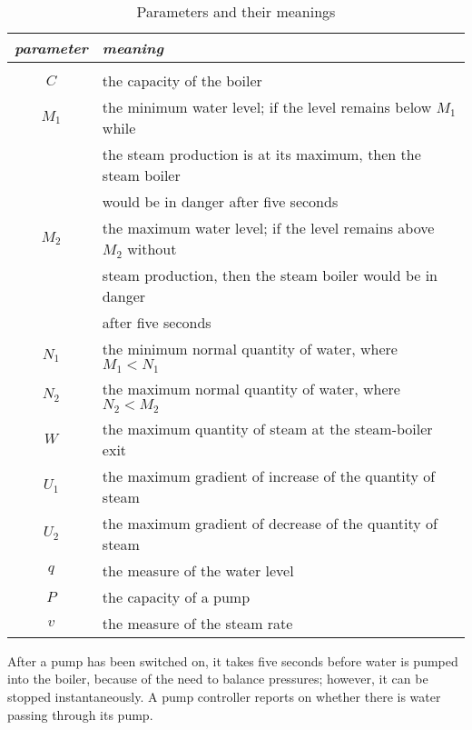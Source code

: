 \documentclass{report}
\begin{document}
\begin{table}[htbp]
  \bigskip %
  \begin{center}\slshape
    \begin{tabular}{c|l}
      \textbf{\slshape parameter} & \textbf{\slshape meaning}
      \\[1mm] %
      \hline %
      \\[-3mm] %
      \( C \) & the capacity of the boiler
      \\ %
      \( M_1 \) & the minimum water level; if the level remains below
      \( M_1 \)\/ while
      \\ %
      & the steam production is at its maximum, then the steam boiler
      \\ %
      & would be in danger after five seconds
      \\ %
      \( M_2 \) & the maximum water level; if the level remains above \(
      M_2 \)\/ without
      \\ %
      & steam production, then the steam boiler would be in danger
      \\ %
      & after five seconds
      \\ %
      \( N_1 \) & the minimum normal quantity of water, where \( M_1 <
      N_1 \)
      \\ %
      \( N_2 \) & the maximum normal quantity of water, where \( N_2 <
      M_2 \)
      \\ %
      \( W \) & the maximum quantity of steam at the steam-boiler exit
      \\ %
      \( U_1 \) & the maximum gradient of increase of the quantity of
      steam
      \\ %
      \( U_2 \) & the maximum gradient of decrease of the quantity of
      steam
      \\ %
      \( q \) & the measure of the water level
      \\ %
      \( P \) & the capacity of a pump
      \\ %
      \( v \) & the measure of the steam rate
    \end{tabular}
  \end{center}
  \caption{Parameters and their meanings}\label{table:parameters}
\end{table}

After a pump has been switched on, it takes five seconds before water
is pumped into the boiler, because of the need to balance pressures;
however, it can be stopped instantaneously.  A pump controller reports
on whether there is water passing through its pump.
\end{document}
